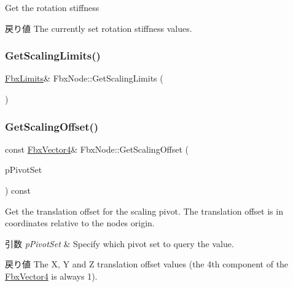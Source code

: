 Get the rotation stiffness \begin{DoxyReturn}{戻り値}
The currently set rotation stiffness values. 
\end{DoxyReturn}
\mbox{\label{class_fbx_node_a26ad319eba8bc3e8803b43a9f512b17e}} 
\subsubsection{\texorpdfstring{Get\+Scaling\+Limits()}{GetScalingLimits()}}
{\footnotesize\ttfamily \hyperlink{class_fbx_limits}{Fbx\+Limits}\& Fbx\+Node\+::\+Get\+Scaling\+Limits (\begin{DoxyParamCaption}{ }\end{DoxyParamCaption})}

\mbox{\label{class_fbx_node_a197fdb9f603ee206707abf56c225d077}} 
\subsubsection{\texorpdfstring{Get\+Scaling\+Offset()}{GetScalingOffset()}}
{\footnotesize\ttfamily const \hyperlink{class_fbx_vector4}{Fbx\+Vector4}\& Fbx\+Node\+::\+Get\+Scaling\+Offset (\begin{DoxyParamCaption}\item[{\hyperlink{class_fbx_node_ae62b7311ac4727654cdf1ebd5cbf7343}{E\+Pivot\+Set}}]{p\+Pivot\+Set }\end{DoxyParamCaption}) const}

Get the translation offset for the scaling pivot. The translation offset is in coordinates relative to the node\textquotesingle{}s origin. 
\begin{DoxyParams}{引数}
{\em p\+Pivot\+Set} & Specify which pivot set to query the value. \\
\hline
\end{DoxyParams}
\begin{DoxyReturn}{戻り値}
The X, Y and Z translation offset values (the 4th component of the \hyperlink{class_fbx_vector4}{Fbx\+Vector4} is always 1). 
\end{DoxyReturn}
\mbox{\label{class_fbx_node_a9ced11788befa42e2ca710e0f7543784}} 
